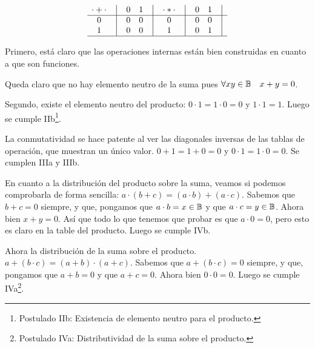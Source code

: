 \documentclass[12pt,a4paper]{article}
\begin{document}
\[
    \begin{matrix}
        {\cdot + \cdot} & \big{\vert} & {0} & {1} & \big{\vert} \\
        \hline
        {0}             & \big{\vert} & {0} & {0} & \big{\vert} \\
        {1}             & \big{\vert} & {0} & {0} & \big{\vert} \\
        \hline
    \end{matrix}
    \quad
    \begin{matrix}
        {\cdot * \cdot} & \big{\vert} & {0} & {1} & \big{\vert} \\
        \hline
        {0}                   & \big{\vert} & {0} & {0} & \big{\vert} \\
        {1}                   & \big{\vert} & {0} & {1} & \big{\vert} \\
        \hline
    \end{matrix}
\]


	Primero, está claro que las operaciones internas están bien construidas
en cuanto a que son funciones.


	Queda claro que no hay elemento neutro de la suma pues \(\forall xy \in
\mathbb{B} \quad x + y = 0\).


	Segundo, existe el elemento neutro del producto: \(0 \cdot 1 = 1 \cdot 0
= 0 \) y \( 1 \cdot 1 = 1 \). Luego se cumple IIb\footnote{Postulado IIb: Existencia de elemento neutro para el producto.}.



	La conmutatividad se hace patente al ver las diagonales inversas de las
tablas de operación, que muestran un único valor. \( 0 + 1 = 1 + 0 = 0\) y
\(0 \cdot 1 = 1 \cdot 0 = 0\). Se cumplen IIIa y IIIb. 



	En cuanto a la distribución del producto sobre la suma, veamos si podemos
comprobarla de forma sencilla: \( a \cdot ( b + c ) = (a \cdot b) + (a \cdot
c) \). Sabemos que \(b + c = 0\) siempre, y que, pongamos que \(a \cdot b = x
\in \mathbb{B}\) y que \(a \cdot c = y \in \mathbb{B}\). Ahora bien \(x + y = 0\). Así
que todo lo que tenemos que probar es que \(a \cdot 0 = 0\), pero esto es
claro en la table del producto. Luego se cumple IVb.



	Ahora la distribución de la suma sobre el producto. \( a + ( b \cdot c )
= (a + b) \cdot (a + c) \). Sabemos que \(a + (b \cdot c) = 0\) siempre, y
que, pongamos que \( a + b = 0 \) y que \(a + c = 0 \). Ahora bien \(0 \cdot
0 = 0\). Luego se cumple IVa\footnote{Postulado IVa: Distributividad de la suma sobre el producto.}.
\end{document}

